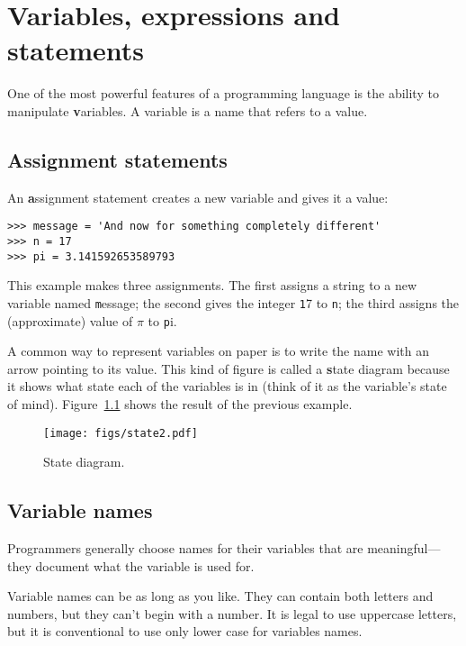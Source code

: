 \documentclass[
DIV=11,
fontsize=13,
twoside,
headinclude=false,
titlepage=firstiscover,
abstract=true,
headsepline=true,
footsepline=true,
chapterprefix=true, %
headings=big,
bibliography=totoc,%
captions=tableheading
]{scrbook}
\theoremstyle{definition}
\begin{document}
\chapter{Variables, expressions and statements}

One of the most powerful features of a programming language is the
ability to manipulate {\textbf variables}.  A variable is a name that
refers to a value.


\section{Assignment statements}
\label{variables}

An {\textbf assignment statement} creates a new variable and gives
it a value:

\begin{lstlisting}
>>> message = 'And now for something completely different'
>>> n = 17
>>> pi = 3.141592653589793
\end{lstlisting}
%
This example makes three assignments.  The first assigns a string
to a new variable named {\texttt message};
the second gives the integer {\texttt 17} to {\texttt n}; the third
assigns the (approximate) value of $\pi$ to {\texttt pi}.

A common way to represent variables on paper is to write the name with
an arrow pointing to its value.  This kind of figure is
called a {\textbf state diagram} because it shows what state each of the
variables is in (think of it as the variable's state of mind).
Figure~\ref{fig.state2} shows the result of the previous example.

\begin{figure}
\centerline
{\texttt{[image: figs/state2.pdf]}}
\caption{State diagram.}
\label{fig.state2}
\end{figure}



\section{Variable names}

Programmers generally choose names for their variables that
are meaningful---they document what the variable is used for.

Variable names can be as long as you like.  They can contain
both letters and numbers, but they can't begin with a number.
It is legal to use uppercase letters, but it is conventional
to use only lower case for variables names.
\end{document}
